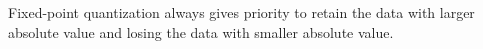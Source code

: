 Fixed-point quantization always gives priority to retain the data with larger absolute value and losing the data with smaller absolute value.


